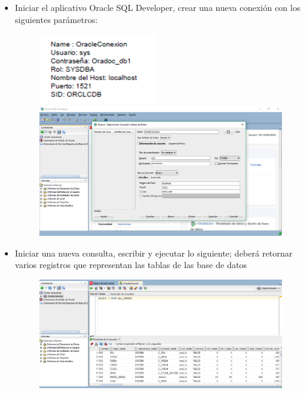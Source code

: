 \begin{itemize}
\begin{figure}[H]
\begin{center}
		\end{center}
		\end{figure}
	\item Iniciar el aplicativo Oracle SQL Developer, crear una nueva conexión con los siguientes parámetros:
		\begin{figure}[H]
		\begin{center}
		\includegraphics[width=5cm]{./Imagenes/t2}
		\includegraphics[width=15cm]{./Imagenes/13}
		\end{center}
		\end{figure}
	\item Iniciar una nueva consulta, escribir y ejecutar lo siguiente; deberá retornar varios registros que representan las tablas de las base de datos
		\begin{figure}[H]
		\begin{center}
		\includegraphics[width=15cm]{./Imagenes/14}
		\end{center}
		\end{figure}

\end{itemize}
